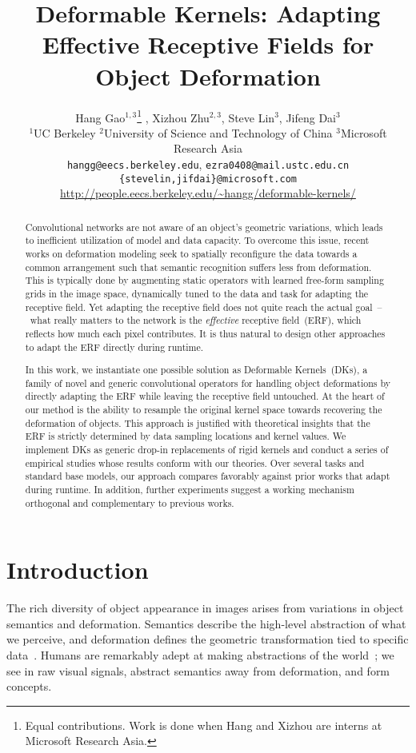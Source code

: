 \documentclass{article} \usepackage{iclr2020_conference, times}
\title{Deformable Kernels: Adapting Effective Receptive Fields for Object Deformation}
\author{
Hang Gao$^{1, 3}$\thanks{
        Equal contributions. Work is done when Hang and Xizhou are interns at
        Microsoft Research Asia.
    } ,
    Xizhou Zhu$^{2, 3}$\footnotemark[1] ,
    Steve Lin$^{3}$,
    Jifeng Dai$^{3}$ \\
    $^1$UC Berkeley
    $^2$University of Science and Technology of China
    $^3$Microsoft Research Asia \\
    \footnotesize{\texttt{hangg@eecs.berkeley.edu}, \texttt{ezra0408@mail.ustc.edu.cn}} \\
    \footnotesize{\texttt{\{stevelin,jifdai\}@microsoft.com}} \\
    \footnotesize{
        {
            \color{magenta}
            \url{http://people.eecs.berkeley.edu/\~hangg/deformable-kernels/}
        }
    }
}
\begin{document}
\maketitle

\begin{abstract}
Convolutional networks are not aware of an object's geometric variations, which leads to inefficient utilization of model and data capacity.
To overcome this issue, recent works on deformation modeling seek to spatially reconfigure the data towards a common arrangement such that semantic recognition suffers less from deformation.
This is typically done by augmenting static operators with learned free-form sampling grids in the image space, dynamically tuned to the data and task for adapting the receptive field.
Yet adapting the receptive field does not quite reach the actual goal~--~what really matters to the network is the \textit{effective} receptive field~(ERF), which reflects how much each pixel contributes.
It is thus natural to design other approaches to adapt the ERF directly during runtime.

In this work, we instantiate one possible solution as Deformable Kernels~(DKs), a family of novel and generic convolutional operators for handling object deformations by directly adapting the ERF while leaving the receptive field untouched.
At the heart of our method is the ability to resample the original kernel space towards recovering the deformation of objects.
This approach is justified with theoretical insights that the ERF is strictly determined by data sampling locations and kernel values.
We implement DKs as generic drop-in replacements of rigid kernels and conduct a series of empirical studies whose results conform with our theories.
Over several tasks and standard base models, our approach compares favorably against prior works that adapt during runtime.
In addition, further experiments suggest a working mechanism orthogonal and complementary to previous works.
\end{abstract}

\section{Introduction}

The rich diversity of object appearance in images arises from variations in object semantics and deformation.
Semantics describe the high-level abstraction of what we perceive, and
deformation defines the geometric transformation tied to specific
data~\citep{gibson1950perception}.
Humans are remarkably adept at making abstractions of the
world~\citep{hudson2019learning}; we see in raw visual signals, abstract
semantics away from deformation, and form concepts.
\end{document}
